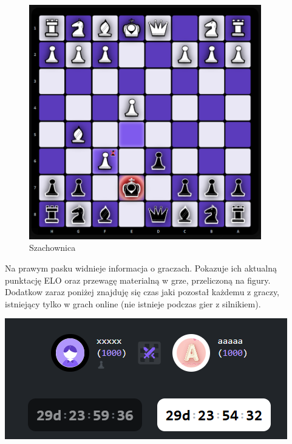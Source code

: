 \documentclass[12pt,a4paper]{article}
\begin{document}
\begin{figure}[h!]
    \centering
    \includegraphics[width=0.9\textwidth]{zdj/ins_min_board.png}
    \caption{Szachownica}
\end{figure}

\newpage


\begin{minipage}[t]{0.45\textwidth} 
    \vspace{0pt} 
    \raggedright 
    Na prawym pasku widnieje informacja o graczach. Pokazuje ich aktualną punktację ELO oraz przewagę materialną w grze, przeliczoną na figury. Dodatkow zaraz poniżej znajduję się czas jaki pozostał każdemu z graczy, istniejący tylko w grach online (nie istnieje podczas gier z silnikiem).
\end{minipage} 
\hfill 
\begin{minipage}[t]{0.45\textwidth} 
    \vspace{0pt} 
    \centering 
    \includegraphics[width=\linewidth]{zdj/ins_min_players.png} 
\end{minipage}
\end{document}
